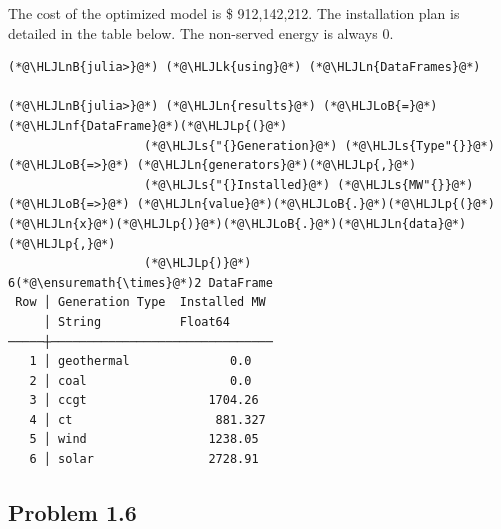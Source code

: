 \documentclass[12pt,a4paper]{article}
\newcommand{\HLJLk}[1]{\textcolor[RGB]{148,91,176}{\textbf{#1}}}
\newcommand{\HLJLn}[1]{#1}
\newcommand{\HLJLnf}[1]{\textcolor[RGB]{66,102,213}{#1}}
\newcommand{\HLJLs}[1]{\textcolor[RGB]{201,61,57}{#1}}
\newcommand{\HLJLnB}[1]{\textcolor[RGB]{59,151,46}{#1}}
\newcommand{\HLJLoB}[1]{\textcolor[RGB]{102,102,102}{\textbf{#1}}}
\newcommand{\HLJLp}[1]{#1}
\begin{document}
The cost of the optimized model is \$ 912,142,212. The installation plan is detailed in the table below. The non-served energy is always 0.


\begin{lstlisting}
(*@\HLJLnB{julia>}@*) (*@\HLJLk{using}@*) (*@\HLJLn{DataFrames}@*)

(*@\HLJLnB{julia>}@*) (*@\HLJLn{results}@*) (*@\HLJLoB{=}@*) (*@\HLJLnf{DataFrame}@*)(*@\HLJLp{(}@*)
                   (*@\HLJLs{"{}Generation}@*) (*@\HLJLs{Type"{}}@*)        (*@\HLJLoB{=>}@*) (*@\HLJLn{generators}@*)(*@\HLJLp{,}@*)
                   (*@\HLJLs{"{}Installed}@*) (*@\HLJLs{MW"{}}@*)  (*@\HLJLoB{=>}@*) (*@\HLJLn{value}@*)(*@\HLJLoB{.}@*)(*@\HLJLp{(}@*)(*@\HLJLn{x}@*)(*@\HLJLp{)}@*)(*@\HLJLoB{.}@*)(*@\HLJLn{data}@*)(*@\HLJLp{,}@*)
                   (*@\HLJLp{)}@*)
6(*@\ensuremath{\times}@*)2 DataFrame
 Row │ Generation Type  Installed MW
     │ String           Float64
─────┼───────────────────────────────
   1 │ geothermal              0.0
   2 │ coal                    0.0
   3 │ ccgt                 1704.26
   4 │ ct                    881.327
   5 │ wind                 1238.05
   6 │ solar                2728.91
\end{lstlisting}

\subsection{Problem 1.6}
\end{document}
